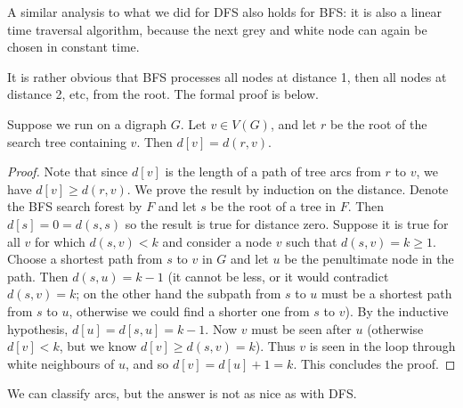A similar analysis to what we did for DFS also holds for BFS: it is also
a linear time traversal algorithm, because the next grey and white node 
can again be chosen in constant time.

It is rather obvious that BFS processes all nodes at distance 1, then
all nodes at distance 2, etc, from the root. The formal proof is below.

\begin{Theorem}
\label{thm:BFSdist}
Suppose we run  on a digraph $G$.
Let $v\in V(G)$, and let $r$ be the root of the  search tree containing $v$. Then $d[v] = d(r, v)$.
\end{Theorem}

\begin{proof}Note that since $d[v]$ is the length of a path of tree arcs from $r$ to $v$, we have $d[v] \geq d(r, v)$. We prove the result by induction on the distance. Denote the BFS search forest
by $F$ and let $s$ be the root of a tree in $F$. Then $d[s] = 0 =
d(s, s)$ so the result is true for distance zero. Suppose it is true for
all $v$ for which $d(s, v) < k$ and consider a node $v$ such that $d(s,
v) = k \geq 1$. Choose a shortest path from $s$ to $v$ in $G$ and let
$u$ be the penultimate node in the path. Then $d(s, u) = k - 1$ (it
cannot be less, or it would contradict $d(s, v) = k$; on the other hand
the subpath from $s$ to $u$ must be a shortest path from $s$ to $u$,
otherwise we could find a shorter one from $s$ to $v$). By the inductive
hypothesis, $d[u] = d[s, u] = k - 1$. Now $v$ must be seen after $u$
(otherwise $d[v] < k$, but we know $d[v] \geq d(s, v) = k$). Thus $v$ is seen in the loop through white neighbours of $u$, and so $d[v] = d[u] + 1 = k$. This concludes the proof.

\end{proof}

We can classify arcs, but the answer is not as nice as with DFS.

